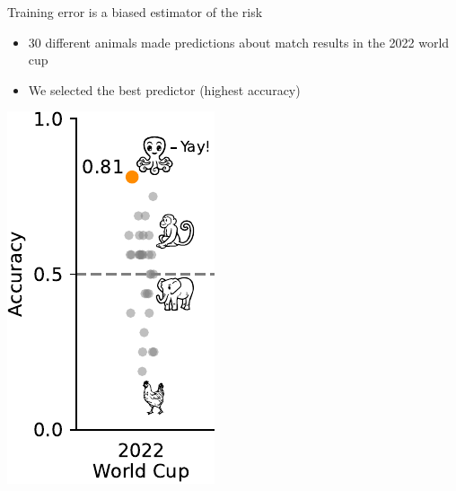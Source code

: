 \documentclass[presentation,mathserif,table]{beamer}
\begin{document}
\begin{frame}[label={sec:org41917dd}]{Training error is a biased estimator of the risk}
\begin{itemize}
\item 30 different animals made predictions about match results in the 2022 world cup
\item We \alert{selected the best predictor} (highest accuracy)
\end{itemize}
\begin{center}
\includegraphics[height=.65 \textheight]{figures/generated/select_evaluate/select_evaluate_2.pdf}
\end{center}
\end{frame}
\end{document}
